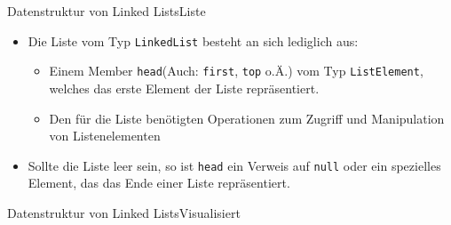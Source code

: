 \begin{frame}{Datenstruktur von Linked Lists}{Liste}
	\begin{itemize}
		\item Die Liste vom Typ \texttt{LinkedList} besteht an sich lediglich aus:
		\begin{itemize}
			\item Einem Member \texttt{head}(Auch: \texttt{first}, \texttt{top} o.Ä.) vom Typ \texttt{ListElement}, welches das erste Element der Liste repräsentiert.
			\item Den für die Liste benötigten Operationen zum Zugriff und Manipulation von Listenelementen
		\end{itemize}
		\item Sollte die Liste leer sein, so ist \texttt{head} ein Verweis auf \texttt{null} oder ein spezielles Element, das das Ende einer Liste repräsentiert.
	\end{itemize}
\end{frame}

\begin{frame}{Datenstruktur von Linked Lists}{Visualisiert}
\end{frame}

